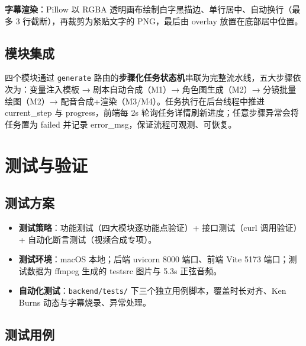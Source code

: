 \documentclass[12pt]{ctexrep}
\begin{document}
\textbf{字幕渲染}：Pillow 以 RGBA 透明画布绘制白字黑描边、单行居中、自动换行（最多 3 行截断），再裁剪为紧贴文字的 PNG，最后由 overlay 放置在底部居中位置。

\section{模块集成}

四个模块通过 \texttt{generate} 路由的\textbf{步骤化任务状态机}串联为完整流水线，五大步骤依次为：变量注入模板 → 剧本自动合成（M1）→ 角色图生成（M2）→ 分镜批量绘图（M2）→ 配音合成+渲染（M3/M4）。任务执行在后台线程中推进 current\_step 与 progress，前端每 2s 轮询任务详情刷新进度；任意步骤异常会将任务置为 failed 并记录 error\_msg，保证流程可观测、可恢复。

\chapter{测试与验证}
\section{测试方案}

\begin{itemize}
\item \textbf{测试策略}：功能测试（四大模块逐功能点验证）+ 接口测试（curl 调用验证）+ 自动化断言测试（视频合成专项）。
\item \textbf{测试环境}：macOS 本地；后端 uvicorn 8000 端口、前端 Vite 5173 端口；测试数据为 ffmpeg 生成的 testsrc 图片与 5.3s 正弦音频。
\item \textbf{自动化测试}：\texttt{backend/tests/} 下三个独立用例脚本，覆盖时长对齐、Ken Burns 动态与字幕烧录、异常处理。
\end{itemize}

\section{测试用例}
\end{document}
